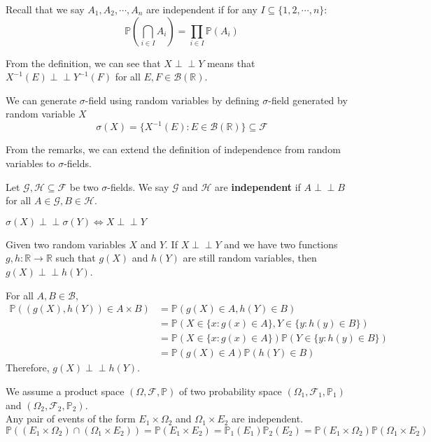 \documentclass{huhtakm-template-book}
\newcommand{\independent}{\perp\!\!\!\perp}
\newcommand{\prob}{\mathbb{P}}
\begin{document}
Recall that we say $A_{1},A_{2},\cdots,A_{n}$ are independent if for any $I\subseteq\{1,2,\cdots,n\}$:
\begin{equation*}
	\prob\left(\bigcap_{i\in I}A_{i}\right)=\prod_{i\in I}\prob(A_{i})
\end{equation*}
\begin{rem}
	From the definition, we can see that $X\independent Y$ means that $X^{-1}(E)\independent Y^{-1}(F)$ for all $E,F\in\mathcal{B}(\mathbb{R})$.
\end{rem}
\begin{rem}
	We can generate $\sigma$-field using random variables by defining $\sigma$-field generated by random variable $X$
	\begin{equation*}
		\sigma(X)=\{X^{-1}(E):E\in\mathcal{B}(\mathbb{R})\}\subseteq\mathcal{F}
	\end{equation*}
\end{rem}
From the remarks, we can extend the definition of independence from random variables to $\sigma$-fields.
\begin{defn}
	Let $\mathcal{G},\mathcal{H}\subseteq\mathcal{F}$ be two $\sigma$-fields. We say $\mathcal{G}$ and $\mathcal{H}$ are \textbf{independent} if $A\independent B$ for all $A\in\mathcal{G},B\in\mathcal{H}$.
\end{defn}
\begin{rem}
	$\sigma(X)\independent\sigma(Y)\iff X\independent Y$
\end{rem}
\begin{thm}
	Given two random variables $X$ and $Y$. If $X\independent Y$ and we have two functions $g,h:\mathbb{R}\to\mathbb{R}$ such that $g(X)$ and $h(Y)$ are still random variables, then $g(X)\independent h(Y)$.
\end{thm}
\begin{proofing}
	For all $A,B\in\mathcal{B}$,
	\begin{align*}
		\prob((g(X),h(Y))\in A\times B)&=\prob(g(X)\in A,h(Y)\in B)\\
		&=\prob(X\in\{x:g(x)\in A\},Y\in\{y:h(y)\in B\})\\
		&=\prob(X\in\{x:g(x)\in A\})\prob(Y\in\{y:h(y)\in B\})\\
		&=\prob(g(X)\in A)\prob(h(Y)\in B)
	\end{align*}
	Therefore, $g(X)\independent h(Y)$.
\end{proofing}
\begin{rem}
	We assume a product space $(\Omega,\mathcal{F},\prob)$ of two probability space $(\Omega_{1},\mathcal{F}_{1},\prob_{1})$ and $(\Omega_{2},\mathcal{F}_{2},\prob_{2})$.\\
	Any pair of events of the form $E_{1}\times\Omega_{2}$ and $\Omega_{1}\times E_{2}$ are independent.
	\begin{equation*}
		\prob((E_{1}\times\Omega_{2})\cap(\Omega_{1}\times E_{2}))=\prob(E_{1}\times E_{2})=\prob_{1}(E_{1})\prob_{2}(E_{2})=\prob(E_{1}\times\Omega_{2})\prob(\Omega_{1}\times E_{2})
	\end{equation*}
\end{rem}
\end{document}
